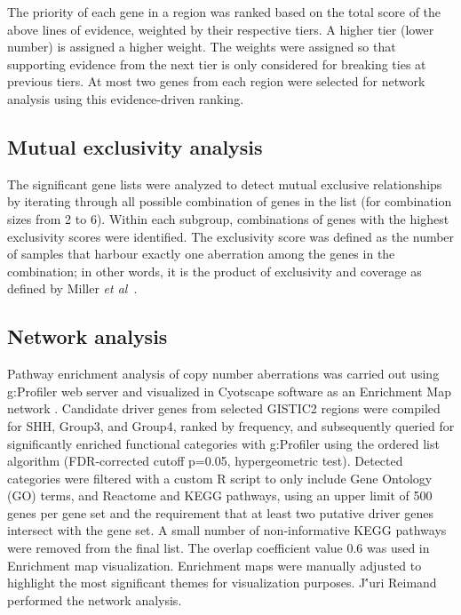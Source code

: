 The priority of each gene in a region was ranked based on the total score of the above lines of evidence, weighted by their respective tiers. A higher tier (lower number) is assigned a higher weight. The weights were assigned so that supporting evidence from the next tier is only considered for breaking ties at previous tiers. At most two genes from each region were selected for network analysis using this evidence-driven ranking.

\subsection{Mutual exclusivity analysis}

The significant gene lists were analyzed to detect mutual exclusive relationships by iterating through all possible combination of genes in the list (for combination sizes from 2 to 6). Within each subgroup, combinations of genes with the highest exclusivity scores were identified. The exclusivity score was defined as the number of samples that harbour exactly one aberration among the genes in the combination; in other words, it is the product of exclusivity and coverage as defined by Miller \emph{et al}\ .

\subsection{Network analysis}

Pathway enrichment analysis of copy number aberrations was carried out using g:Profiler web server  and visualized in Cyotscape software as an Enrichment Map network . Candidate driver genes from selected GISTIC2 regions were compiled for SHH, Group3, and Group4, ranked by frequency, and subsequently queried for significantly enriched functional categories with g:Profiler using the ordered list algorithm (FDR-corrected cutoff p=0.05, hypergeometric test). Detected categories were filtered with a custom R script to only include Gene Ontology (GO) terms, and Reactome and KEGG pathways, using an upper limit of 500 genes per gene set and the requirement that at least two putative driver genes intersect with the gene set. A small number of non-informative KEGG pathways were removed from the final list. The overlap coefficient value 0.6 was used in Enrichment map visualization.  Enrichment maps were manually adjusted to highlight the most significant themes for visualization purposes.  J\''{u}ri Reimand performed the network analysis.

